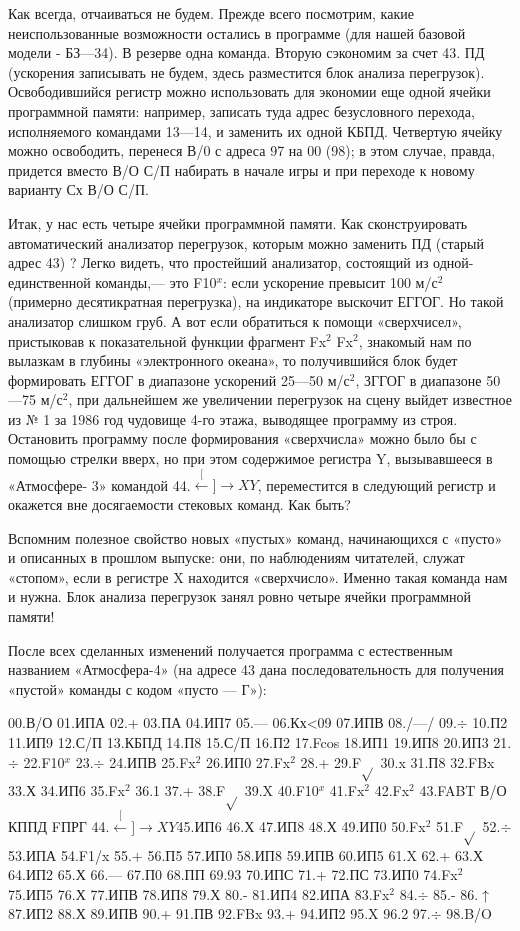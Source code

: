 \documentclass[11pt,a4paper,oneside]{article}
\def\XY{$\stackrel[\leftarrow]{\rightarrow}{XY}$}
\begin{document}
Как всегда, отчаиваться не будем. Прежде всего посмотрим, какие неиспользованные возможности остались в программе (для нашей базовой модели - БЗ—34). В резерве одна команда. Вторую сэкономим за счет 43. ПД (ускорения записывать не будем, здесь разместится блок анализа перегрузок). Освободившийся регистр можно использовать для экономии еще одной ячейки программной памяти: например, записать туда адрес безусловного перехода, исполняемого командами 13—14, и заменить их одной КБПД. Четвертую ячейку можно освободить, перенеся В/0 с адреса 97 на 00 (98); в этом случае, правда, придется вместо В/О С/П набирать в начале игры и при переходе к новому варианту Сх В/О С/П.

Итак, у нас есть четыре ячейки программной памяти. Как сконструировать автоматический анализатор перегрузок, которым можно заменить ПД (старый адрес 43) ? Легко видеть, что простейший анализатор, состоящий из одной-единственной команды,— это F10$^{x}$: если ускорение превысит 100 м/с$^{2}$ (примерно десятикратная перегрузка), на индикаторе выскочит ЕГГОГ. Но такой анализатор слишком груб. А вот если обратиться к помощи «сверхчисел», пристыковав к показательной функции фрагмент Fx$^{2}$ Fx$^{2}$, знакомый нам по вылазкам в глубины «электронного океана», то получившийся блок будет формировать ЕГГОГ в диапазоне ускорений 25—50	м/с$^{2}$, ЗГГОГ в диапазоне 50—75 м/с$^{2}$, при дальнейшем же увеличении перегрузок на сцену выйдет известное из № 1 за 1986 год чудовище 4-го этажа, выводящее программу из строя. Остановить программу после формирования «сверхчисла» можно было бы с помощью стрелки вверх, но при этом содержимое регистра Y, вызывавшееся в «Атмосфере- 3» командой 44.\XY, переместится в следующий регистр и окажется вне досягаемости стековых команд. Как быть?

Вспомним полезное свойство новых «пустых» команд, начинающихся с «пусто» и описанных в прошлом выпуске: они, по наблюдениям читателей, служат «стопом», если в регистре X находится «сверхчисло». Именно такая команда нам и нужна. Блок анализа перегрузок занял ровно четыре ячейки программной памяти!

После всех сделанных изменений получается программа с естественным названием «Атмосфера-4» (на адресе 43 дана последовательность для получения «пустой» команды с кодом «пусто — Г»):

00.В/О 01.ИПА 02.+ 03.ПА 04.ИП7 05.— 06.Кх<09 07.ИПВ 08./—/ 09.$\div$ 10.П2 11.ИП9 12.С/П 13.КБПД 14.П8 15.С/П 16.П2 17.Fcos 18.ИП1 19.ИП8 20.ИП3 21.$\div$ 22.F10$^{x}$ 23.$\div$ 24.ИПВ 25.Fx$^{2}$ 26.ИП0 27.Fx$^{2}$ 28.+ 29.F$\sqrt{}$ 30.x 31.П8 32.FBx 33.Х 34.ИП6 35.Fx$^{2}$ 36.1 37.+ 38.F$\sqrt{}$ 39.X 40.F10$^{x}$ 41.Fx$^{2}$ 42.Fx$^{2}$ 43.FABT В/О КППД FПРГ 44.\XY 45.ИП6 46.Х 47.ИП8 48.Х 49.ИП0
50.Fx$^{2}$ 51.F$\sqrt{}$ 52.$\div$ 53.ИПА 54.F1/x 55.+ 56.П5 57.ИП0 58.ИП8 59.ИПВ 60.ИП5 61.X 62.+ 63.Х 64.ИП2 65.Х 66.— 67.П0 68.ПП 69.93 70.ИПС 71.+ 72.ПС 73.ИП0 74.Fx$^{2}$ 75.ИП5 76.Х 77.ИПВ 78.ИП8 79.Х 80.- 81.ИП4 82.ИПА 83.Fx$^{2}$ 84.$\div$ 85.- 86.$\uparrow$ 87.ИП2 88.Х 89.ИПВ 90.+ 91.ПВ 92.FBx 93.+ 94.ИП2 95.X 96.2 97.$\div$ 98.B/O
\end{document}
